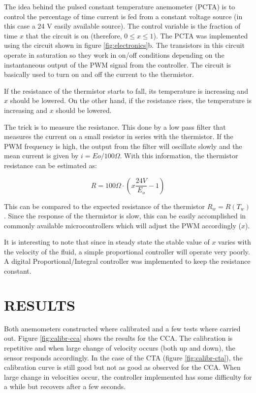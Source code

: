\documentclass[10pt,fleqn,a4paper,twoside]{article}
\begin{document}
The idea behind the pulsed constant temperature anemometer (PCTA) is to control the percentage of time current is fed from a constant voltage source (in this case a 24 V easily available source). The control variable is the fraction of time $x$ that the circuit is on (therefore, $0 \le x \le 1$). The PCTA was implemented using the circuit shown in figure \ref{fig:electronics}b. The transistors in this circuit operate in saturation so they work in on/off conditions depending on the instantaneous output of the PWM signal from the controller. The circuit is basically used to turn on and off the current to the thermistor.

If the resistance of the thermistor starts to fall, its temperature is increasing and $x$ should be lowered. On the other hand, if the resistance rises, the temperature is increasing and $x$ should be lowered.

The trick is to measure the resistance. This done by a low pass filter that measures the current on a small resistor in series with the thermistor. If the PWM frequency is high, the output from the filter will oscillate slowly and the mean current is given by $i = Eo / 100\Omega$. With this information, the thermistor resistance can be estimated as:

\begin{equation}
  R = 100\Omega\cdot\left( x \frac{24V}{E_o} - 1 \right)
  \label{eq:Rt}
\end{equation}

This can be compared to the expected resistance of the thermistor $R_w = R(T_w)$. Since the response of the thermistor is slow, this can be easily accomplished in commonly available microcontrollers which will adjust the PWM accordingly ($x$).

It is interesting to note that since in steady state the stable value of $x$ varies with the velocity of the fluid, a simple proportional controller will operate very poorly. A digital Proportional/Integral controller was implemented to keep the resistance constant.

\section{RESULTS}

Both anemometers constructed where calibrated and a few tests where carried out. Figure \ref{fig:calibr-cca} shows the results for the CCA. The calibration is repetitive and when large change of velocity occurs (both up and down), the sensor responds accordingly. In the case of the CTA (figure \ref{fig:calibr-cta}), the calibration curve is still good but not as good as observed for the CCA. When large change in velocities occur, the controller implemented has some difficulty for a while but recovers after a few seconds.
\end{document}
